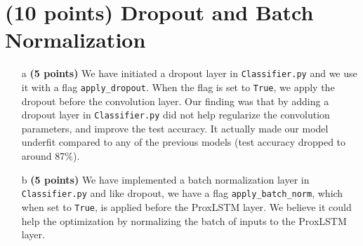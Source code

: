 \documentclass[11pt]{report}
\begin{document}
\section{(10 points) Dropout and Batch Normalization}
\begin{itemize}
    \item[a] \textbf{(5 points)} We have initiated a dropout layer in \texttt{Classifier.py} and we use it with a flag \texttt{apply\_dropout}. When the flag is set to \texttt{True}, we apply the dropout before the convolution layer. 
    Our finding was that by adding a dropout layer in \texttt{Classifier.py} did not help regularize the convolution parameters, and improve the test accuracy. 
    It actually made our model underfit compared to any of the previous models (test accuracy dropped to around 87\%).  

    \item[b] \textbf{(5 points)} We have implemented a batch normalization layer in \texttt{Classifier.py} and like dropout, we have a flag \texttt{apply\_batch\_norm}, which when set to \texttt{True}, is applied before the ProxLSTM layer. We believe it could help the optimization by normalizing the batch of inputs to the ProxLSTM layer. 
\end{itemize}
\end{document}
